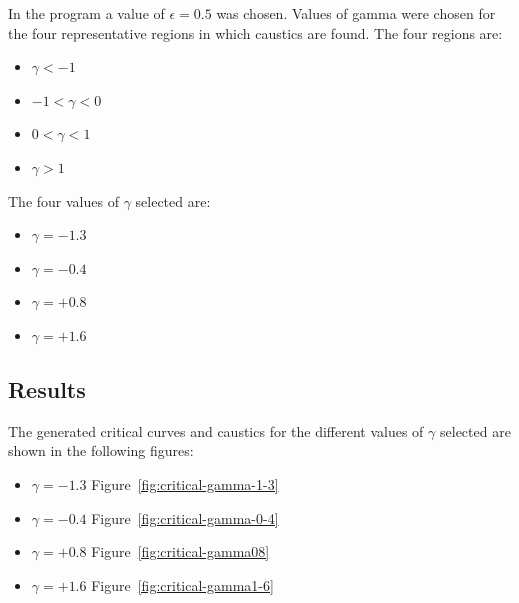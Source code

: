 \documentclass[aspectratio=1610,xcolor=dvipsnames,t]{beamer}
\begin{document}
    In the program a value of $\epsilon = 0.5$ was chosen. Values
    of gamma were chosen for the four representative regions in which
    caustics are found. The four regions are:
    \begin{itemize}
        \item $\gamma < -1$
        \item $-1 < \gamma < 0$
        \item $0 < \gamma < 1$
        \item $\gamma > 1$
    \end{itemize}
    The four values of $\gamma$ selected are:
    \begin{itemize}
        \item $\gamma = -1.3$ 
        \item $\gamma = -0.4$
        \item $\gamma = +0.8$
        \item $\gamma = +1.6$
    \end{itemize}

    \subsection{Results}
    The generated critical curves and caustics for the different values of $\gamma$ selected 
    are shown in the following figures:
    \begin{itemize}
        \item $\gamma = -1.3$ Figure~\ref{fig:critical-gamma-1-3} 
        \item $\gamma = -0.4$ Figure~\ref{fig:critical-gamma-0-4}
        \item $\gamma = +0.8$ Figure~\ref{fig:critical-gamma08} 
        \item $\gamma = +1.6$ Figure~\ref{fig:critical-gamma1-6}
    \end{itemize} 
   
\end{document}
